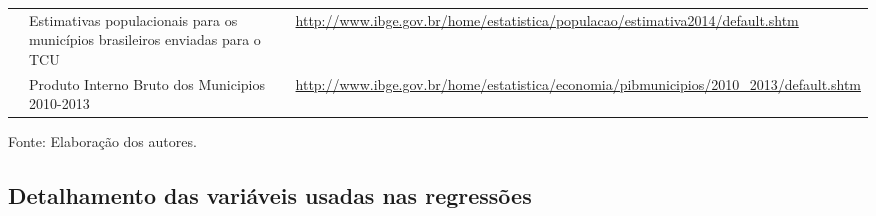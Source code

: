 \documentclass[twoside,onecolumn,12pt]{article}
\numberwithin{outputctr}{section}
\begin{document}
\begin{table}[!htb]
\begin{tabular}{|p{3cm}|p{5cm}|p{8cm}|}
 & Estimativas populacionais para os munic\'{i}pios brasileiros enviadas para o TCU & \url{http://www.ibge.gov.br/home/estatistica/populacao/estimativa2014/default.shtm} \\ \cline{2-3}
 & Produto Interno Bruto dos Municipios 2010-2013 & \url{http://www.ibge.gov.br/home/estatistica/economia/pibmunicipios/2010_2013/default.shtm} \\
\hline
\end{tabular}
\begin{tablenotes}
\item \tiny{Fonte: Elaboração dos autores.}
\end{tablenotes}
\end{table}

\clearpage

\subsection{Detalhamento das vari\'{a}veis usadas nas regress\~{o}es \label{secApendice_Variaveis}}
\end{document}
